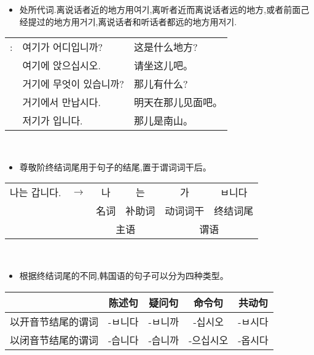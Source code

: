 \begin{grammar}
\begin{grammarsect}[\kr 여기, 거기, 저기]
\begin{itemize}
            \item 处所代词.离说话者近的地方用{\kr 여기},离听者近而离说话者远的地方,或者前面己经提过的地方用{\kr 거기},离说话者和听话者都远的地方用{\kr 저기}.
        \end{itemize}
        \begin{tabular}{lll}
            \kr \ruby{例}{예}:&\kr  여기가 어디입니까?&这是什么地方? \\
            &\kr 여기에 앉으십시오.&请坐这儿吧。\\
            &\kr 거기에 무엇이 있습니까?&那儿有什么?\\
            &\kr \ruby{來日}{내일} 거기에서 만납시다.&明天在那儿见面吧。\\
            &\kr 저기가 \ruby{南山}{남산}입니다.&那儿是南山。
        \end{tabular}\\
    \end{grammarsect}
    \begin{grammarsect}[尊敬阶终结词尾]\label{gram:ref}
        \begin{itemize}
            \item 尊敬阶终结词尾用于句子的结尾,置于谓词词干后。
        \end{itemize}
        \begin{tabular}{llcccc}
            \kr 나는 갑니다.&$\to $&\kr 나&\kr 는&\kr 가&\kr ㅂ니다\\
            &&名词&补助词&动词词干&终结词尾\\\cmidrule(r){3-4} \cmidrule(l){5-6}
            &&\multicolumn{2}{c}{主语}&\multicolumn{2}{c}{谓语}
        \end{tabular}\\
        \begin{itemize}
            \item 根据终结词尾的不同,韩国语的句子可以分为四种类型。
        \end{itemize}
        \begin{tabular}{|c|c|c|c|c|}\hline
            \diagbox{谓词类型}{句子类型}&陈述句&疑问句&命令句&共动句\\\hline
            以开音节结尾的谓词 &\kr -ㅂ니다 &\kr -ㅂ니까 &\kr -십시오 &\kr -ㅂ시다\\\hline
            以闭音节结尾的谓词 &\kr -습니다 &\kr -습니까 &\kr -으십시오 &\kr -옵시다\\\hline
        \end{tabular}\\
        \begin{itemize}

\end{itemize}
\end{grammarsect}
\end{grammar}
